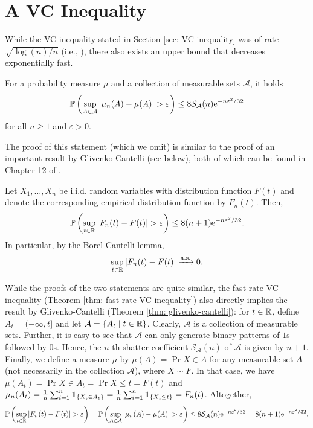 \section{A  VC Inequality}

While the VC inequality stated in Section \ref{sec: VC inequality} was of rate $\sqrt{\log(n) / n}$ (i.e., ), there also exists an upper bound that decreases exponentially fast.

\begin{theorem}
\label{thm: fast rate VC inequality}
For a probability measure $\mu$ and a collection of measurable sets $\mathcal{A}$, it holds
\[
    \mathbb{P}\left( \sup_{A \in \mathcal{A}} \abs{\mu_n(A) - \mu(A)} > \varepsilon \right) \leq 8 \mathcal{S}_{\mathcal{A}}(n) \mathrm{e}^{-n\varepsilon^2/32}
\]
for all $n \geq 1$ and $\varepsilon > 0$.
\end{theorem}

The proof of this statement (which we omit) is similar to the proof of an important result by Glivenko-Cantelli (see below), both of which can be found in Chapter 12 of  \cite{devroye1996probabilistic}.

\begin{theorem}
\label{thm: glivenko-cantelli}
Let $X_1, \dots, X_n$ be i.i.d. random variables with distribution function $F(t)$ and denote the corresponding empirical distribution function by $F_n(t)$. Then,
\[
    \mathbb{P}\left( \sup_{t\in\mathbb{R}} \abs{F_n(t) - F(t)} > \varepsilon \right) \leq 8(n+1) \mathrm{e}^{-n\varepsilon^2/32}.
\]
In particular, by the Borel-Cantelli lemma,
\[
    \sup_{t\in\mathbb{R}} \abs{F_n(t) - F(t)} \xrightarrow{\mathrm{a.s.}} 0.
\]
\end{theorem}

\begin{remark}
While the proofs of the two statements are quite similar, the fast rate VC inequality (Theorem \ref{thm: fast rate VC inequality}) also directly implies the result by Glivenko-Cantelli (Theorem \ref{thm: glivenko-cantelli}): for $t \in \mathbb{R}$, define $A_t = (-\infty, t]$ and let $\mathcal{A} = \left\{A_t \mathrel{|} t \in \mathbb{R}\right\}$. Clearly, $\mathcal{A}$ is a collection of measurable sets. Further, it is easy to see that $\mathcal{A}$ can only generate binary patterns of $1$s followed by $0$s. Hence, the $n$-th shatter coefficient $\mathcal{S}_{\mathcal{A}}(n)$ of $\mathcal{A}$ is given by $n+1$. Finally, we define a measure $\mu$ by $\mu(A) = \Pr{X \in A}$ for any measurable set $A$ (not necessarily in the collection $\mathcal{A}$), where $X \sim F$. In that case, we have $\mu(A_t) = \Pr{X \in A_t} = \Pr{X \leq t} = F(t)$ and $\mu_n(A_t) = \frac{1}{n} \sum_{i=1}^n \mathbf{1}_{\left\{X_i \in A_t\right\}} = \frac{1}{n} \sum_{i=1}^n \mathbf{1}_{\left\{X_i \leq t\right\}} = F_n(t)$. Altogether,
\[
    \mathbb{P}\left( \sup_{t\in\mathbb{R}} \abs{F_n(t) - F(t)} > \varepsilon \right) = \mathbb{P}\left( \sup_{A \in \mathcal{A}} \abs{\mu_n(A) - \mu(A)} > \varepsilon \right) \leq 8 \mathcal{S}_{\mathcal{A}}(n) \mathrm{e}^{-n\varepsilon^2/32} = 8 (n+1) \mathrm{e}^{-n\varepsilon^2/32}.
\]
\end{remark}
